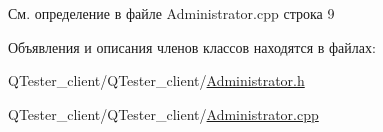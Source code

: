 См. определение в файле Administrator.\+cpp строка 9



Объявления и описания членов классов находятся в файлах\+:\begin{DoxyCompactItemize}
\item 
Q\+Tester\+\_\+client/\+Q\+Tester\+\_\+client/\hyperlink{_administrator_8h}{Administrator.\+h}\item 
Q\+Tester\+\_\+client/\+Q\+Tester\+\_\+client/\hyperlink{_administrator_8cpp}{Administrator.\+cpp}\end{DoxyCompactItemize}
